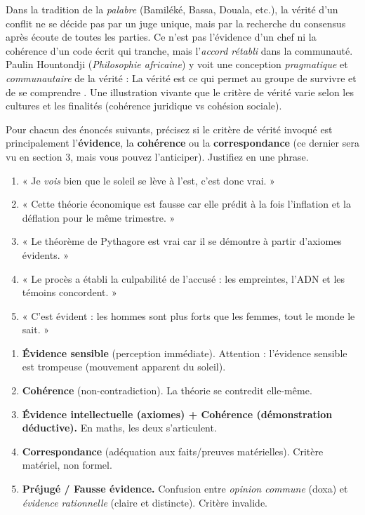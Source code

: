 \documentclass[11pt]{article}
\newcommand{\cle}[1]{{\popxbold\color{popdark}#1}}
\begin{document}
\begin{savaistu}
Dans la tradition de la \emph{palabre} (Bamiléké, Bassa, Douala, etc.), la vérité d'un conflit ne se décide pas par un juge unique, mais par la \cle{recherche du consensus} après écoute de toutes les parties. Ce n'est pas l'évidence d'un chef ni la cohérence d'un code écrit qui tranche, mais l'\emph{accord rétabli} dans la communauté. Paulin Hountondji (\emph{Philosophie africaine}) y voit une conception \emph{pragmatique} et \emph{communautaire} de la vérité : \guillemotleft La vérité est ce qui permet au groupe de survivre et de se comprendre \guillemotright. Une illustration vivante que le critère de vérité varie selon les cultures et les finalités (cohérence juridique vs cohésion sociale).
\end{savaistu}

\begin{exercice}
Pour chacun des énoncés suivants, précisez si le critère de vérité invoqué est principalement l'\textbf{évidence}, la \textbf{cohérence} ou la \textbf{correspondance} (ce dernier sera vu en section 3, mais vous pouvez l'anticiper). Justifiez en une phrase.
\begin{enumerate}
    \item « Je \emph{vois} bien que le soleil se lève à l'est, c'est donc vrai. »
    \item « Cette théorie économique est fausse car elle prédit à la fois l'inflation et la déflation pour le même trimestre. »
    \item « Le théorème de Pythagore est vrai car il se démontre à partir d'axiomes évidents. »
    \item « Le procès a établi la culpabilité de l'accusé : les empreintes, l'ADN et les témoins concordent. »
    \item « C'est évident : les hommes sont plus forts que les femmes, tout le monde le sait. »
\end{enumerate}
\end{exercice}

\begin{corrige}[Exercice 1]
\begin{enumerate}
    \item \textbf{Évidence sensible} (perception immédiate). Attention : l'évidence sensible est trompeuse (mouvement apparent du soleil).
    \item \textbf{Cohérence} (non-contradiction). La théorie se contredit elle-même.
    \item \textbf{Évidence intellectuelle (axiomes) + Cohérence (démonstration déductive).} En maths, les deux s'articulent.
    \item \textbf{Correspondance} (adéquation aux faits/preuves matérielles). Critère matériel, non formel.
    \item \textbf{Préjugé / Fausse évidence.} Confusion entre \emph{opinion commune} (doxa) et \emph{évidence rationnelle} (claire et distincte). Critère invalide.
\end{enumerate}
\end{corrige}
\end{document}
